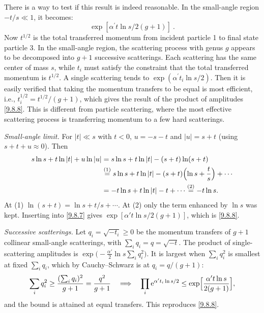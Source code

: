 There is a way to test if this result is indeed reasonable. In the small-angle region $-t / s \ll 1$, it becomes:
\begin{equation}
	\exp [\alpha^{\prime} t \ln s / 2(g+1)] \:.
	\label{9.8.8}
\end{equation}
Now $t^{1 / 2}$ is the total transferred momentum from incident particle 1 to final state particle 3. In the small-angle region, the scattering process with genus $g$ appears to be decomposed into $g{+}1$ successive scatterings. 
Each scattering has the same center of mass $s$, while $t_{i}$ must satisfy the constraint that the total transferred momentum is $t^{1/2}$.
A single scattering tends to $\exp (\alpha^{\prime} t_{i} \ln s / 2)$. 
Then it is easily verified that taking the momentum transfers to be equal is most efficient, i.e., $t_{i}^{1/2}=t^{1/2} /(g+1)$, which gives the result of the product of amplitudes \eqref{9.8.8}. 
This is different from particle scattering, where the most effective scattering process is transferring momentum to a few hard scatterings.
\begin{tcolorbox}[breakable]
	\begin{remark}
		\emph{Small-angle limit.} For $|t|\ll s$ with $t<0$, $u=-s-t$ and $|u|=s+t$ (using $s+t+u\approx0$). Then
		\begin{align*}
			s\ln s+t\ln|t|+u\ln|u|&=s\ln s+t\ln|t|-(s+t)\ln(s+t)\\
			&\overset{(1)}{=}s\ln s+t\ln|t|-(s+t)\Bigl(\ln s+\frac ts\Bigr)+\cdots\\
			&=-t\ln s+t\ln|t|-t+\cdots\overset{(2)}{=}-t\ln s .
		\end{align*}
		At (1) $\ln(s+t)=\ln s+t/s+\cdots$. At (2) only the term enhanced by $\ln s$ was kept. Inserting into \eqref{9.8.7} gives $\exp[\alpha't\ln s/2(g+1)]$, which is \eqref{9.8.8}.

		\emph{Successive scatterings.} Let $q_i=\sqrt{-t_i}\ge0$ be the momentum transfers of $g+1$ collinear small-angle scatterings, with $\sum_iq_i=q=\sqrt{-t}$. The product of single-scattering amplitudes is $\exp\bigl(-\frac{\alpha'}{2}\ln s\sum_iq_i^2\bigr)$. It is largest when $\sum_iq_i^2$ is smallest at fixed $\sum_iq_i$, which by Cauchy--Schwarz is at $q_i=q/(g+1)$:
		\begin{equation*}
			\sum_iq_i^2\ge\frac{(\sum_iq_i)^2}{g+1}=\frac{q^2}{g+1}\quad\Longrightarrow\quad\prod_i\mathrm{e}^{\alpha't_i\ln s/2}\le\exp\Bigl[\frac{\alpha't\ln s}{2(g+1)}\Bigr],
		\end{equation*}
		and the bound is attained at equal transfers. This reproduces \eqref{9.8.8}.
	\end{remark}
\end{tcolorbox}


